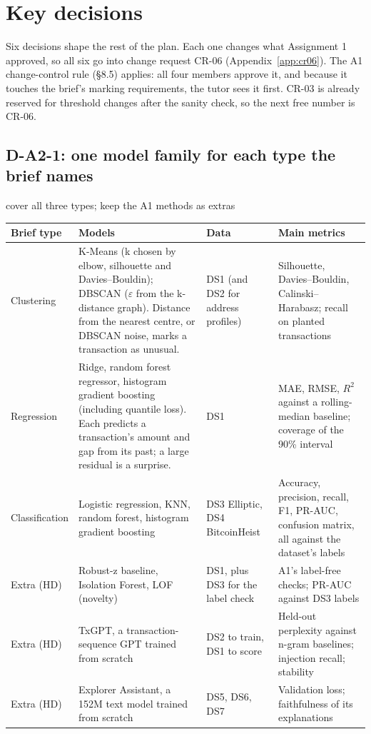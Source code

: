 \section{Key decisions}
\label{sec:decisions}

Six decisions shape the rest of the plan. Each one changes what Assignment 1 approved, so all six
go into change request CR-06 (Appendix~\ref{app:cr06}). The A1 change-control rule (§8.5) applies:
all four members approve it, and because it touches the brief's marking requirements, the tutor
sees it first. CR-03 is already reserved for threshold changes after the sanity check, so the next
free number is CR-06.

\subsection{D-A2-1: one model family for each type the brief names}
\label{sec:methodmap}

\begin{decision}{cover all three types; keep the A1 methods as extras}
\small
\begin{tabularx}{\linewidth}{@{}L{2.2cm}L{4.1cm}L{2.4cm}Y@{}}
\toprule
\textbf{Brief type} & \textbf{Models} & \textbf{Data} & \textbf{Main metrics} \\
\midrule
Clustering & K-Means (k chosen by elbow, silhouette and Davies--Bouldin); DBSCAN ($\varepsilon$ from the k-distance graph). Distance from the nearest centre, or DBSCAN noise, marks a transaction as unusual. & DS1 (and DS2 for address profiles) & Silhouette, Davies--Bouldin, Calinski--Harabasz; recall on planted transactions \\
Regression & Ridge, random forest regressor, histogram gradient boosting (including quantile loss). Each predicts a transaction's amount and gap from its past; a large residual is a surprise. & DS1 & MAE, RMSE, $R^2$ against a rolling-median baseline; coverage of the 90\% interval \\
Classification & Logistic regression, KNN, random forest, histogram gradient boosting & DS3 Elliptic, DS4 BitcoinHeist & Accuracy, precision, recall, F1, PR-AUC, confusion matrix, all against the dataset's labels \\
\midrule
Extra (HD) & Robust-z baseline, Isolation Forest, LOF (novelty) & DS1, plus DS3 for the label check & A1's label-free checks; PR-AUC against DS3 labels \\
Extra (HD) & TxGPT, a transaction-sequence GPT trained from scratch & DS2 to train, DS1 to score & Held-out perplexity against n-gram baselines; injection recall; stability \\
Extra (HD) & Explorer Assistant, a 152M text model trained from scratch & DS5, DS6, DS7 & Validation loss; faithfulness of its explanations \\
\bottomrule
\end{tabularx}
\end{decision}

